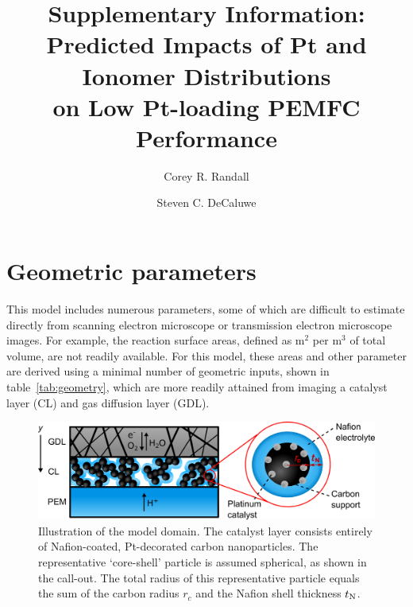 \documentclass[final,3p,times,onecolumn]{elsarticle}    %
\begin{document}
\begin{frontmatter}
\title{Supplementary Information: Predicted Impacts of Pt and Ionomer Distributions \\ 
       on Low Pt-loading PEMFC Performance}

\author[CSM]{Corey R. Randall}
\author[CSM]{Steven C. DeCaluwe }
        
\address[CSM]{Colorado School of Mines, 1500 Illinois St, Golden, CO 80401}
\end{frontmatter}

\section{Geometric parameters}
This model includes numerous parameters, some of which are difficult to estimate directly from scanning electron microscope or transmission electron microscope images. For example, the reaction surface areas, defined as m$^2$ per m$^3$ of total volume, are not readily available. For this model, these areas and other parameter are derived using a minimal number of geometric inputs, shown in table~\ref{tab:geometry}, which are more readily attained from imaging a catalyst layer (CL) and gas diffusion layer (GDL).

\begin{figure}[H]
    \centering
    \includegraphics[width=5.718in]{figures/core_shell_SI.png}
    \caption{Illustration of the model domain. The catalyst layer consists entirely of Nafion-coated, Pt-decorated carbon nanoparticles. The representative `core-shell' particle is assumed spherical, as shown in the call-out. The total radius of this representative particle equals the sum of the carbon radius $r_c$ and the Nafion shell thickness $t_{\rm N}$.}
    \label{fig:core_shell_SI}
\end{figure}
\end{document}
